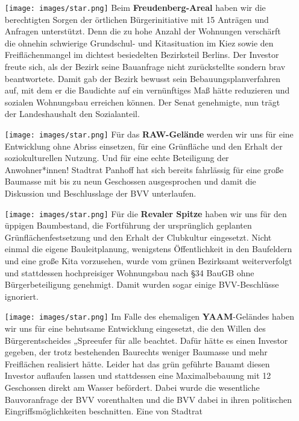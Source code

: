 \documentclass[a4paper,10pt]{article}
\begin{document}
\begin{itemize}
\itemsep1pt\parskip0pt
\item[\texttt{[image: images/star.png]}]
  Beim \textbf{Freudenberg-Areal} haben wir die berechtigten Sorgen der
  örtlichen Bürgerinitiative mit 15 Anträgen und Anfragen unterstützt.
  Denn die zu hohe Anzahl der Wohnungen verschärft die ohnehin
  schwierige Grundschul- und Kitasituation im Kiez sowie den
  Freiflächenmangel im dichtest besiedelten Bezirksteil Berlins. Der
  Investor freute sich, als der Bezirk seine Bauanfrage nicht
  zurückstellte sondern brav beantwortete. Damit gab der Bezirk bewusst
  sein Bebauungsplanverfahren auf, mit dem er die Baudichte auf ein
  vernünftiges Maß hätte reduzieren und sozialen Wohnungsbau erreichen
  können. Der Senat genehmigte, nun trägt der Landeshaushalt den
  Sozialanteil.
\item[\texttt{[image: images/star.png]}]
  Für das \textbf{RAW-Gelände} werden wir uns für eine Entwicklung ohne
  Abriss einsetzen, für eine Grünfläche und den Erhalt der
  soziokulturellen Nutzung. Und für eine echte Beteiligung der
  Anwohner*innen! Stadtrat Panhoff hat sich bereits fahrlässig für eine
  große Baumasse mit bis zu neun Geschossen ausgesprochen und damit die
  Diskussion und Beschlusslage der BVV unterlaufen.
\item[\texttt{[image: images/star.png]}]
  Für die \textbf{Revaler Spitze} haben wir uns für den üppigen
  Baumbestand, die Fortführung der ursprünglich geplanten
  Grünflächenfestsetzung und den Erhalt der Clubkultur eingesetzt. Nicht
  einmal die eigene Bauleitplanung, wenigstens Öffentlichkeit in den
  Baufeldern und eine große Kita vorzusehen, wurde vom grünen Bezirksamt
  weiterverfolgt und stattdessen hochpreisiger Wohnungsbau nach §34
  BauGB ohne Bürgerbeteiligung genehmigt. Damit wurden sogar einige
  BVV-Beschlüsse ignoriert.
  \enlargethispage{-4em}
\item[\texttt{[image: images/star.png]}]
  Im Falle des ehemaligen \textbf{YAAM}-Geländes haben wir uns für eine
  behutsame Entwicklung eingesetzt, die den Willen des Bürgerentscheides
  „Spreeufer für alle{\grqq} beachtet. Dafür hätte es einen Investor gegeben,
  der trotz bestehenden Baurechts weniger Baumasse und mehr Freiflächen
  realisiert hätte. Leider hat das grün geführte Bauamt diesen Investor
  auflaufen lassen und stattdessen eine Maximalbebauung mit 12
  Geschossen direkt am Wasser befördert. Dabei wurde die wesentliche
  Bauvoranfrage der BVV vorenthalten und die BVV dabei in ihren
  politischen Eingriffsmöglichkeiten beschnitten. Eine von Stadtrat

\end{itemize}
\end{document}
